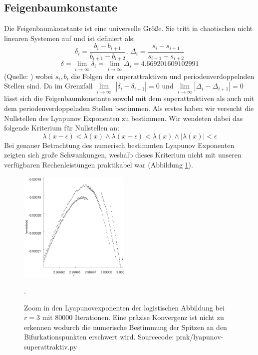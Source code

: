 \documentclass[11,5pt, twoside]{article}
\begin{document}
\subsection{Feigenbaumkonstante}
Die Feigenbaumkonstante ist eine universelle Größe. Sie tritt in chaotischen nicht linearen Systemen auf und ist definiert als:
\begin{equation}\delta_i = \frac{b_i-b_{i+1}}{b_{i+1}-b_{i+2}}\text{, }\Delta_i=\frac{s_i-s_{i+1}}{s_{i+1}-s_{i+2}}\end{equation}
\begin{equation}\delta = \lim\limits_{i \rightarrow \infty}{\delta_i}= \lim\limits_{i \rightarrow \infty}{\Delta_i} = 4.669201609102991\end{equation} 
(Quelle: \parencite{feigenbaum})
wobei $s_i, b_i$ die Folgen der superattraktiven und periodenverdoppelnden Stellen sind.
Da im Grenzfall $\lim\limits_{i \rightarrow \infty}$ $|\delta_i - \delta_{i+1}|=0$ und $\lim\limits_{i \rightarrow \infty} |\Delta_i - \Delta_{i+1}|=0$  lässt sich die Feigenbaumkonstante sowohl mit dem superattraktiven als auch mit dem periodenverdoppelnden Stellen bestimmen. 
Als erstes haben wir versucht die Nullstellen des Lyapunov Exponenten zu bestimmen. Wir wendeten dabei das folgende Kriterium für Nullstellen an:
\begin{equation}
\lambda(x-\epsilon) < \lambda(x) \wedge \lambda(x+\epsilon) < \lambda(x) \wedge |\lambda(x)|<\epsilon
\end{equation}
Bei genauer Betrachtung des numerisch bestimmten Lyapunov Exponenten zeigten sich große Schwankungen, weshalb dieses Kriterium nicht mit unseren verfügbaren Rechenleistungen praktikabel war (Abbildung \ref{fig:lya-rauschen}).
\begin{figure}[!htbp]
\centering
\includegraphics[height=200px]{lya-rauschen}
\caption{Zoom in den Lyapunovexponenten der logistischen Abbildung bei $r=3$ mit 80000 Iterationen. 
Eine präzise Konvergenz ist nicht zu erkennen wodurch die numerische Bestimmung der Spitzen an den Bifurkationspunkten erschwert wird. Sourcecode: prak/lyapunov-superattraktiv.py}. 
\label{fig:lya-rauschen}
\end{figure}
\end{document}
